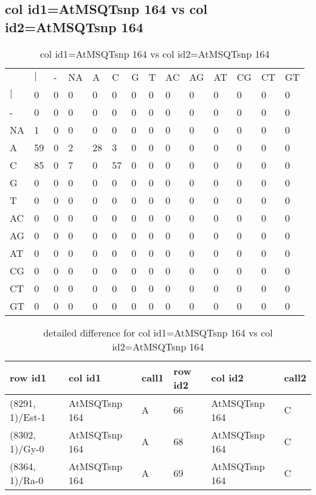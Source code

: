 \subsection{col id1=AtMSQTsnp 164 vs col id2=AtMSQTsnp 164}
\begin{center}
\begin{longtable}{|l|l|l|l|l|l|l|l|l|l|l|l|l|l|}
\caption{col id1=AtMSQTsnp 164 vs col id2=AtMSQTsnp 164} \label{table_dm538}\\
\hline
\\
\hline
&$|$&-&NA&A&C&G&T&AC&AG&AT&CG&CT&GT\\
$|$&0&0&0&0&0&0&0&0&0&0&0&0&0\\
-&0&0&0&0&0&0&0&0&0&0&0&0&0\\
NA&1&0&0&0&0&0&0&0&0&0&0&0&0\\
A&59&0&2&28&3&0&0&0&0&0&0&0&0\\
C&85&0&7&0&57&0&0&0&0&0&0&0&0\\
G&0&0&0&0&0&0&0&0&0&0&0&0&0\\
T&0&0&0&0&0&0&0&0&0&0&0&0&0\\
AC&0&0&0&0&0&0&0&0&0&0&0&0&0\\
AG&0&0&0&0&0&0&0&0&0&0&0&0&0\\
AT&0&0&0&0&0&0&0&0&0&0&0&0&0\\
CG&0&0&0&0&0&0&0&0&0&0&0&0&0\\
CT&0&0&0&0&0&0&0&0&0&0&0&0&0\\
GT&0&0&0&0&0&0&0&0&0&0&0&0&0\\
\hline
\end{longtable}
\end{center}

\begin{center}
\begin{longtable}{|l|l|l|l|l|l|}
\caption{detailed difference for col id1=AtMSQTsnp 164 vs col id2=AtMSQTsnp 164} \label{table_dm539}\\
\hline
row id1&col id1&call1&row id2&col id2&call2\\
\hline
(8291, 1)/Est-1&AtMSQTsnp 164&A&66&AtMSQTsnp 164&C\\
(8302, 1)/Gy-0&AtMSQTsnp 164&A&68&AtMSQTsnp 164&C\\
(8364, 1)/Ra-0&AtMSQTsnp 164&A&69&AtMSQTsnp 164&C\\
\hline
\end{longtable}
\end{center}

